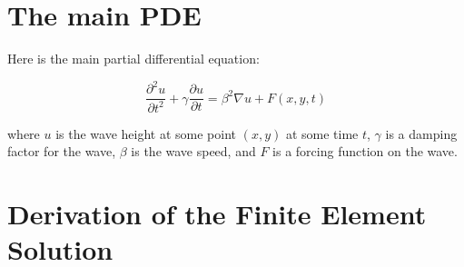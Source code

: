 \documentclass[a4paper,12pt]{article}
\begin{document}
\section{The main PDE}
Here is the main partial differential equation:

\begin{equation}
\frac{\partial^2u}{\partial t^2} + \gamma \frac{\partial u}{\partial t}
=
\beta^2 \nabla u + F(x,y,t)
\end{equation}

where $u$ is the wave height at some point $(x,y)$ at some time $t$, $\gamma$ is a damping factor for the wave,
$\beta$ is the wave speed, and $F$ is a forcing function on the wave.

\section{Derivation of the Finite Element Solution}
\end{document}
